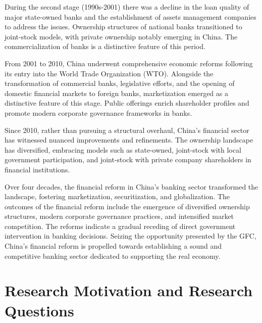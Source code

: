 \documentclass[
  12pt,
  a4paper,
]{scrreprt}
\begin{document}
During the second stage (1990s-2001) there was a decline in the loan
quality of major state-owned banks and the establishment of assets
management companies to address the issues. Ownership structures of
national banks transitioned to joint-stock models, with private
ownership notably emerging in China. The commercialization of banks is a
distinctive feature of this period.

From 2001 to 2010, China underwent comprehensive economic reforms
following its entry into the World Trade Organization (WTO). Alongside
the transformation of commercial banks, legislative efforts, and the
opening of domestic financial markets to foreign banks, marketization
emerged as a distinctive feature of this stage. Public offerings enrich
shareholder profiles and promote modern corporate governance frameworks
in banks.

Since 2010, rather than pursuing a structural overhaul, China's
financial sector has witnessed nuanced improvements and refinements. The
ownership landscape has diversified, embracing models such as
state-owned, joint-stock with local government participation, and
joint-stock with private company shareholders in financial institutions.

Over four decades, the financial reform in China's banking sector
transformed the landscape, fostering marketization, securitization, and
globalization. The outcomes of the financial reform include the
emergence of diversified ownership structures, modern corporate
governance practices, and intensified market competition. The reforms
indicate a gradual receding of direct government intervention in banking
decisions. Seizing the opportunity presented by the GFC, China's
financial reform is propelled towards establishing a sound and
competitive banking sector dedicated to supporting the real economy.

\section{Research Motivation and Research
Questions}\label{research-motivation-and-research-questions}
\end{document}
